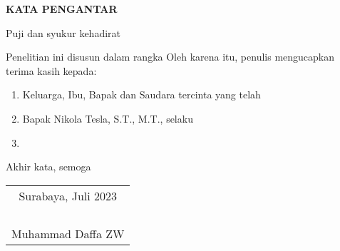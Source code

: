 \begin{center}
    \Large
    \textbf{KATA PENGANTAR}
  \end{center}
  
  
  \vspace{2ex}
  
  
  Puji dan syukur kehadirat \lipsum[1][1-5]
  
  Penelitian ini disusun dalam rangka \lipsum[2][1-5]
  Oleh karena itu, penulis mengucapkan terima kasih kepada:
  
  \begin{enumerate}[nolistsep]
  
    \item Keluarga, Ibu, Bapak dan Saudara tercinta yang telah \lipsum[3][1-2]
  
    \item Bapak Nikola Tesla, S.T., M.T., selaku \lipsum[4][1-2]
  
    \item \lipsum[5][1-3]
  
  \end{enumerate}
  
  Akhir kata, semoga \lipsum[6][1-8]
  
  \begin{flushright}
    \begin{tabular}[b]{c}
      Surabaya, Juli 2023 \\
      \\
      \\
      \\
      \\
      Muhammad Daffa ZW
    \end{tabular}
  \end{flushright}